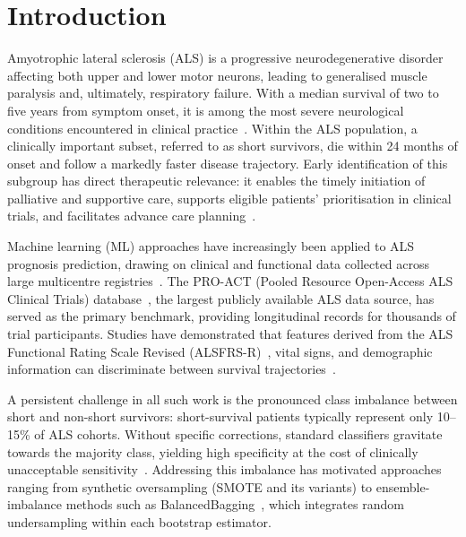 \documentclass[a4paper,twoside]{article}
\begin{document}
\onecolumn \maketitle \normalsize \setcounter{footnote}{0} \vfill

\newpage

\section{Introduction}
\label{sec:intro}

Amyotrophic lateral sclerosis (ALS) is a progressive neurodegenerative disorder
affecting both upper and lower motor neurons, leading to generalised muscle
paralysis and, ultimately, respiratory failure. With a median survival of two to
five years from symptom onset, it is among the most severe neurological
conditions encountered in clinical practice~\cite{Feldman2022}. Within the ALS
population, a clinically important subset, referred to as short survivors, die
within 24 months of onset and follow a markedly faster disease trajectory. Early
identification of this subgroup has direct therapeutic relevance: it enables the
timely initiation of palliative and supportive care, supports eligible patients'
prioritisation in clinical trials, and facilitates advance care
planning~\cite{Miller2012}.

Machine learning (ML) approaches have increasingly been applied to ALS prognosis
prediction, drawing on clinical and functional data collected across large
multicentre registries~\cite{Grollemund2019,Papaiz2022}. The PRO-ACT (Pooled
Resource Open-Access ALS Clinical Trials) database~\cite{PROACT}, the largest
publicly available ALS data source, has served as the primary benchmark,
providing longitudinal records for thousands of trial participants. Studies have
demonstrated that features derived from the ALS Functional Rating Scale Revised
(ALSFRS-R)~\cite{cedarbaum1999alsfrs}, vital signs, and demographic information
can discriminate between survival trajectories~\cite{Ramamoorthy2022,Halbersberg2023}.

A persistent challenge in all such work is the pronounced class imbalance between
short and non-short survivors: short-survival patients typically represent only
10--15\% of ALS cohorts. Without specific corrections, standard classifiers
gravitate towards the majority class, yielding high specificity at the cost of
clinically unacceptable sensitivity~\cite{chawla2002smote}. Addressing this
imbalance has motivated approaches ranging from synthetic oversampling (SMOTE and
its variants) to ensemble-imbalance methods such as
BalancedBagging~\cite{lemaitre2017}, which integrates random undersampling within
each bootstrap estimator.
\end{document}
